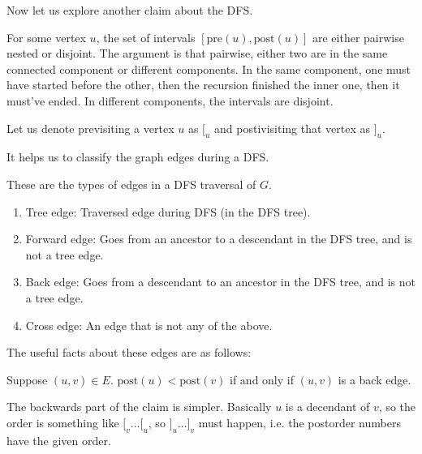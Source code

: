 Now let us explore another claim about the DFS.

\begin{note}
    For some vertex $u$, the set of intervals $[\text{pre}(u), \text{post}(u)]$ are either
    pairwise nested or disjoint. The argument is that pairwise, either two are in the same connected component or different components.
    In the same component, one must have started before the other, then the recursion finished the inner one, then it must've ended. In different components,
    the intervals are disjoint.

    Let us denote previsiting a vertex $u$ as $[_u$ and postivisiting that vertex as $]_u$.
\end{note}

It helps us to classify the graph edges during a DFS.

\begin{definition} 
    These are the types of edges in a DFS traversal of $G$.
    \begin{enumerate}
        \item Tree edge: Traversed edge during DFS (in the DFS tree).
        \item Forward edge: Goes from an ancestor to a descendant in the DFS tree, and is not a tree edge.
        \item Back edge: Goes from a descendant to an ancestor in the DFS tree, and is not a tree edge.
        \item Cross edge: An edge that is not any of the above.
    \end{enumerate}
\end{definition}

The useful facts about these edges are as follows:

\begin{theorem}
    Suppose $(u, v) \in E$. $\text{post}(u) < \text{post}(v)$ if and only if $(u, v)$ is a back edge.

    \begin{proof*}
    The backwards part of the claim is simpler. Basically $u$ is a decendant of $v$, so the order is something like $[_v \dots [_u$, so $]_u \dots ]_v$
    must happen, i.e. the postorder numbers have the given order.

    \end{proof*}
\end{theorem}

